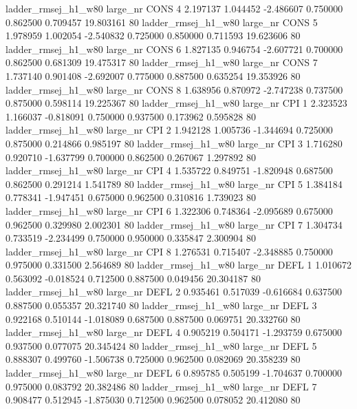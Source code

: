 ladder_rmsej_h1_w80   large_nr     CONS                 4  2.197137  1.044452  -2.486607 0.750000 0.862500  0.709457   19.803161 80
ladder_rmsej_h1_w80   large_nr     CONS                 5  1.978959  1.002054  -2.540832 0.725000 0.850000  0.711593   19.623606 80
ladder_rmsej_h1_w80   large_nr     CONS                 6  1.827135  0.946754  -2.607721 0.700000 0.862500  0.681309   19.475317 80
ladder_rmsej_h1_w80   large_nr     CONS                 7  1.737140  0.901408  -2.692007 0.775000 0.887500  0.635254   19.353926 80
ladder_rmsej_h1_w80   large_nr     CONS                 8  1.638956  0.870972  -2.747238 0.737500 0.875000  0.598114   19.225367 80
ladder_rmsej_h1_w80   large_nr      CPI                 1  2.323523  1.166037  -0.818091 0.750000 0.937500  0.173962    0.595828 80
ladder_rmsej_h1_w80   large_nr      CPI                 2  1.942128  1.005736  -1.344694 0.725000 0.875000  0.214866    0.985197 80
ladder_rmsej_h1_w80   large_nr      CPI                 3  1.716280  0.920710  -1.637799 0.700000 0.862500  0.267067    1.297892 80
ladder_rmsej_h1_w80   large_nr      CPI                 4  1.535722  0.849751  -1.820948 0.687500 0.862500  0.291214    1.541789 80
ladder_rmsej_h1_w80   large_nr      CPI                 5  1.384184  0.778341  -1.947451 0.675000 0.962500  0.310816    1.739023 80
ladder_rmsej_h1_w80   large_nr      CPI                 6  1.322306  0.748364  -2.095689 0.675000 0.962500  0.329980    2.002301 80
ladder_rmsej_h1_w80   large_nr      CPI                 7  1.304734  0.733519  -2.234499 0.750000 0.950000  0.335847    2.300904 80
ladder_rmsej_h1_w80   large_nr      CPI                 8  1.276531  0.715407  -2.348885 0.750000 0.975000  0.331500    2.564689 80
ladder_rmsej_h1_w80   large_nr     DEFL                 1  1.010672  0.563092  -0.018524 0.712500 0.887500  0.049456   20.304187 80
ladder_rmsej_h1_w80   large_nr     DEFL                 2  0.935461  0.517039  -0.616684 0.637500 0.887500  0.055357   20.321740 80
ladder_rmsej_h1_w80   large_nr     DEFL                 3  0.922168  0.510144  -1.018089 0.687500 0.887500  0.069751   20.332760 80
ladder_rmsej_h1_w80   large_nr     DEFL                 4  0.905219  0.504171  -1.293759 0.675000 0.937500  0.077075   20.345424 80
ladder_rmsej_h1_w80   large_nr     DEFL                 5  0.888307  0.499760  -1.506738 0.725000 0.962500  0.082069   20.358239 80
ladder_rmsej_h1_w80   large_nr     DEFL                 6  0.895785  0.505199  -1.704637 0.700000 0.975000  0.083792   20.382486 80
ladder_rmsej_h1_w80   large_nr     DEFL                 7  0.908477  0.512945  -1.875030 0.712500 0.962500  0.078052   20.412080 80
